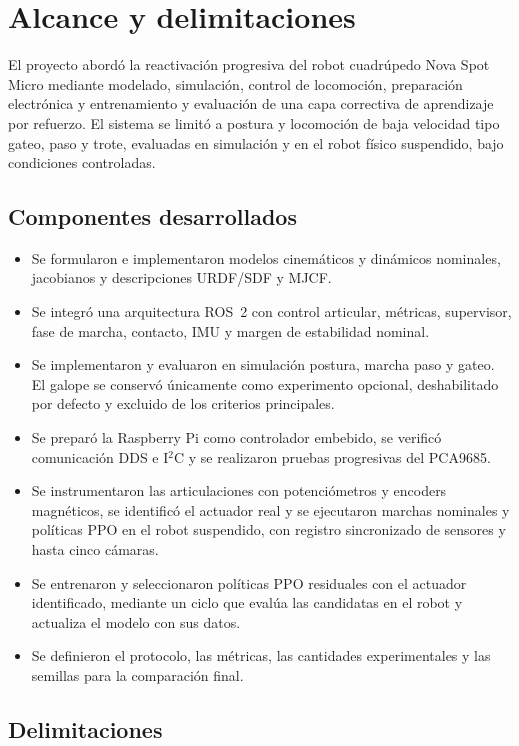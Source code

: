 \chapter{Alcance y delimitaciones}

El proyecto abordó la reactivación progresiva del robot cuadrúpedo Nova Spot
Micro mediante modelado, simulación, control de locomoción, preparación
electrónica y entrenamiento y evaluación de una capa correctiva de aprendizaje por refuerzo.
El sistema se limitó a postura y locomoción de baja velocidad tipo gateo, paso
y trote, evaluadas en simulación y en el robot físico suspendido, bajo
condiciones controladas.

\section{Componentes desarrollados}

\begin{itemize}
\item Se formularon e implementaron modelos cinemáticos y dinámicos nominales,
jacobianos y descripciones URDF/SDF y MJCF.
\item Se integró una arquitectura ROS~2 con control articular, métricas,
supervisor, fase de marcha, contacto, IMU y margen de estabilidad nominal.
\item Se implementaron y evaluaron en simulación postura, marcha paso y gateo.
El galope se conservó únicamente como experimento opcional, deshabilitado por
defecto y excluido de los criterios principales.
\item Se preparó la Raspberry Pi como controlador embebido, se verificó
comunicación DDS e I$^2$C y se realizaron pruebas progresivas del PCA9685.
\item Se instrumentaron las articulaciones con potenciómetros y encoders
magnéticos, se identificó el actuador real y se ejecutaron marchas nominales y
políticas PPO en el robot suspendido, con registro sincronizado de sensores y
hasta cinco cámaras.
\item Se entrenaron y seleccionaron políticas PPO residuales con el actuador
identificado, mediante un ciclo que evalúa las candidatas en el robot y
actualiza el modelo con sus datos.
\item Se definieron el protocolo, las métricas, las cantidades experimentales y
las semillas para la comparación final.
\end{itemize}

\section{Delimitaciones}


